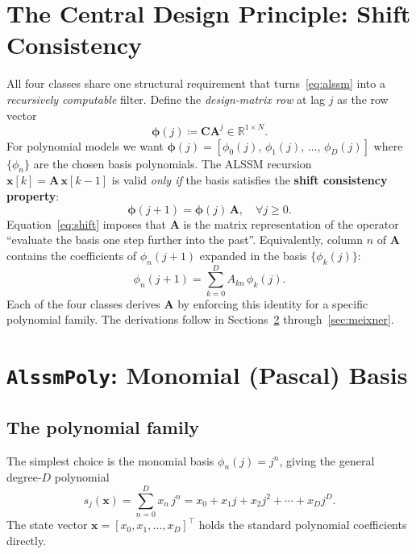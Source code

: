 \documentclass[11pt, a4paper]{article}
\theoremstyle{definition}
\newcommand{\R}{\mathbb{R}}
\newcommand{\vx}{\bm{x}}
\newcommand{\vC}{\bm{C}}
\newcommand{\mA}{\bm{A}}
\newcommand{\mphi}{\bm{\phi}}
\newcommand{\defeq}{\coloneqq}
\begin{document}
\section{The Central Design Principle: Shift Consistency}

All four classes share one structural requirement that turns~\eqref{eq:alssm}
into a \emph{recursively computable} filter.  Define the \emph{design-matrix
row} at lag $j$ as the row vector
\[
  \mphi(j) \defeq \vC \mA^j \in \R^{1 \times N}.
\]
For polynomial models we want $\mphi(j) = [\phi_0(j),\, \phi_1(j),\, \ldots,\,
\phi_D(j)]$ where $\{\phi_n\}$ are the chosen basis polynomials.  The
ALSSM recursion $\vx[k] = \mA\,\vx[k-1]$ is valid \emph{only if} the basis
satisfies the \textbf{shift consistency property}:
\begin{equation}
  \mphi(j+1) = \mphi(j)\,\mA, \quad \forall j \geq 0.
  \label{eq:shift}
\end{equation}
Equation~\eqref{eq:shift} imposes that $\mA$ is the matrix representation
of the operator ``evaluate the basis one step further into the past''.
Equivalently, column $n$ of $\mA$ contains the coefficients of $\phi_n(j+1)$
expanded in the basis $\{\phi_k(j)\}$:
\[
  \phi_n(j+1) = \sum_{k=0}^{D} A_{kn}\,\phi_k(j).
\]
Each of the four classes derives $\mA$ by enforcing this identity for a
specific polynomial family.  The derivations follow in Sections~\ref{sec:poly}
through~\ref{sec:meixner}.

\section{\texttt{AlssmPoly}: Monomial (Pascal) Basis}
\label{sec:poly}

\subsection{The polynomial family}

The simplest choice is the monomial basis $\phi_n(j) = j^n$, giving the
general degree-$D$ polynomial
\begin{equation}
  s_j(\vx) = \sum_{n=0}^{D} x_n\, j^n
           = x_0 + x_1 j + x_2 j^2 + \cdots + x_D j^D.
\end{equation}
The state vector $\vx = [x_0, x_1, \ldots, x_D]^\top$ holds the
standard polynomial coefficients directly.
\end{document}
